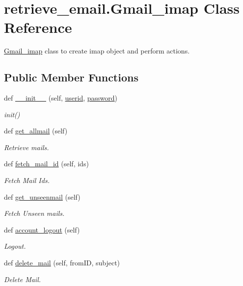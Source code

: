 \hypertarget{classretrieve__email_1_1Gmail__imap}{}\section{retrieve\+\_\+email.\+Gmail\+\_\+imap Class Reference}
\label{classretrieve__email_1_1Gmail__imap}


\hyperlink{classretrieve__email_1_1Gmail__imap}{Gmail\+\_\+imap} class to create imap object and perform actions.  


\subsection*{Public Member Functions}
\begin{DoxyCompactItemize}
\item 
def \hyperlink{classretrieve__email_1_1Gmail__imap_ac61ba6b0ffcee2275f2a1063666449d0}{\+\_\+\+\_\+init\+\_\+\+\_\+} (self, \hyperlink{classretrieve__email_1_1Gmail__imap_a241e396e8bbcedd36d899dce1d7b4528}{userid}, \hyperlink{classretrieve__email_1_1Gmail__imap_a99bff913652cb1e676cb021ed54be41d}{password})
\begin{DoxyCompactList}\small\item\em init() \end{DoxyCompactList}\item 
def \hyperlink{classretrieve__email_1_1Gmail__imap_ad4be5f7d3c2cc476a924e5af796e1a62}{get\+\_\+allmail} (self)
\begin{DoxyCompactList}\small\item\em Retrieve mails. \end{DoxyCompactList}\item 
def \hyperlink{classretrieve__email_1_1Gmail__imap_a7649b5f3a875089f884dae33fdab0c1c}{fetch\+\_\+mail\+\_\+id} (self, ids)
\begin{DoxyCompactList}\small\item\em Fetch Mail Ids. \end{DoxyCompactList}\item 
def \hyperlink{classretrieve__email_1_1Gmail__imap_ada9c563841b45b9525dcf73cd6731325}{get\+\_\+unseenmail} (self)
\begin{DoxyCompactList}\small\item\em Fetch Unseen mails. \end{DoxyCompactList}\item 
def \hyperlink{classretrieve__email_1_1Gmail__imap_a00e6ba7ac3754447224ac70929b4883d}{account\+\_\+logout} (self)
\begin{DoxyCompactList}\small\item\em Logout. \end{DoxyCompactList}\item 
def \hyperlink{classretrieve__email_1_1Gmail__imap_ad583ee96dbc3e7ecc1623feecc1983e1}{delete\+\_\+mail} (self, from\+ID, subject)
\begin{DoxyCompactList}\small\item\em Delete Mail. \end{DoxyCompactList}\end{DoxyCompactItemize}
